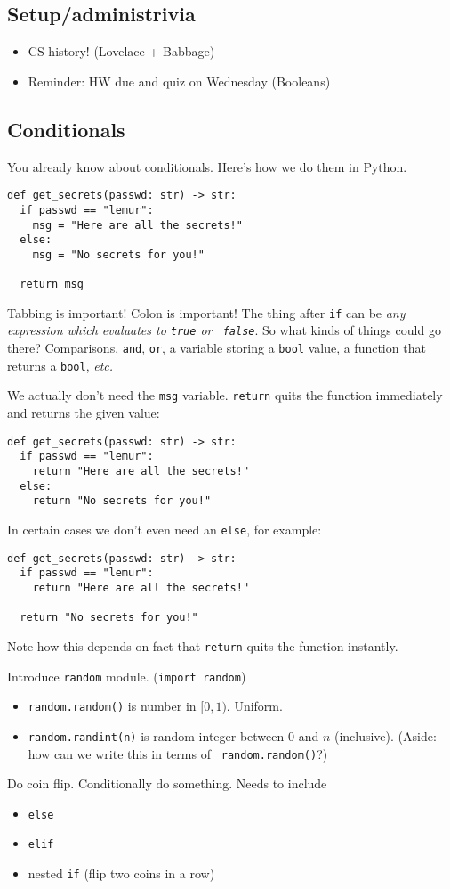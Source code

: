 \documentclass{article}
\newcommand{\etc}{\emph{etc.}\xspace}
\begin{document}
\subsection*{Setup/administrivia}

\begin{itemize}
\item CS history! (Lovelace + Babbage)
\item Reminder: HW due and quiz on Wednesday (Booleans)
\end{itemize}

\subsection*{Conditionals}

You already know about conditionals.  Here's how we do them in Python.

\begin{verbatim}
def get_secrets(passwd: str) -> str:
  if passwd == "lemur":
    msg = "Here are all the secrets!"
  else:
    msg = "No secrets for you!"

  return msg
\end{verbatim}

Tabbing is important!  Colon is important!  The thing after {\tt if}
can be \emph{any expression which evaluates to {\tt true} or {\tt
    false}}.  So what kinds of things could go there?  Comparisons,
\verb|and|, \verb|or|, a variable storing a \verb|bool| value, a
function that returns a \verb|bool|, \etc

We actually don't need the \verb|msg| variable.  \verb|return| quits
the function immediately and returns the given value:

\begin{verbatim}
def get_secrets(passwd: str) -> str:
  if passwd == "lemur":
    return "Here are all the secrets!"
  else:
    return "No secrets for you!"
\end{verbatim}

In certain cases we don't even need an \verb|else|, for example:
\begin{verbatim}
def get_secrets(passwd: str) -> str:
  if passwd == "lemur":
    return "Here are all the secrets!"

  return "No secrets for you!"
\end{verbatim}
Note how this depends on fact that \verb|return| quits the function
instantly.

Introduce \verb|random| module. ({\tt import random})
\begin{itemize}
\item {\tt random.random()} is number in $[0,1)$. Uniform.
\item {\tt random.randint(n)} is random integer between $0$ and $n$
  (inclusive).  (Aside: how can we write this in terms of {\tt
    random.random()}?)
\end{itemize}
Do coin flip.  Conditionally do something.  Needs to include
\begin{itemize}
\item {\tt else}
\item {\tt elif}
\item nested {\tt if}  (flip two coins in a row)
\end{itemize}
\end{document}
